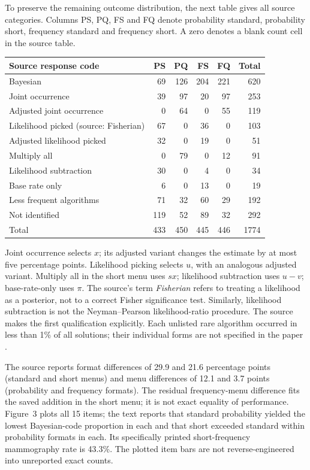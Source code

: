 To preserve the remaining outcome distribution, the next table gives all
source categories. Columns PS, PQ, FS and FQ denote probability standard,
probability short, frequency standard and frequency short. A zero denotes
a blank count cell in the source table.
\begin{center}\small
\begin{tabular}{lrrrrr}
Source response code&PS&PQ&FS&FQ&Total\\\hline
Bayesian&69&126&204&221&620\\
Joint occurrence&39&97&20&97&253\\
Adjusted joint occurrence&0&64&0&55&119\\
Likelihood picked (source: Fisherian)&67&0&36&0&103\\
Adjusted likelihood picked&32&0&19&0&51\\
Multiply all&0&79&0&12&91\\
Likelihood subtraction&30&0&4&0&34\\
Base rate only&6&0&13&0&19\\
Less frequent algorithms&71&32&60&29&192\\
Not identified&119&52&89&32&292\\\hline
Total&433&450&445&446&1774
\end{tabular}
\end{center}
Joint occurrence selects \(x\); its adjusted variant changes the estimate
by at most five percentage points. Likelihood picking selects \(u\), with
an analogous adjusted variant. Multiply all in the short menu uses \(sx\);
likelihood subtraction uses \(u-v\); base-rate-only uses \(\pi\).
The source's term \emph{Fisherian} refers to treating a likelihood as a
posterior, not to a correct Fisher significance test. Similarly, likelihood
subtraction is not the Neyman--Pearson likelihood-ratio procedure. The source
makes the first qualification explicitly. Each unlisted rare algorithm
occurred in less than 1\% of all solutions; their individual forms are not
specified in the paper \cite[pp.~694--695]{GigerenzerHoffrage1995FrequencyFormats}.

The source reports format differences of 29.9 and 21.6 percentage points
(standard and short menus) and menu differences of 12.1 and 3.7 points
(probability and frequency formats). The residual frequency-menu difference
fits the saved addition in the short menu; it is not exact equality of
performance. Figure~3 plots all 15 items; the text reports that standard
probability yielded the lowest Bayesian-code proportion in each and that
short exceeded standard within probability formats in each. Its specifically
printed short-frequency mammography rate is 43.3\%. The plotted item bars
are not reverse-engineered into unreported exact counts.

